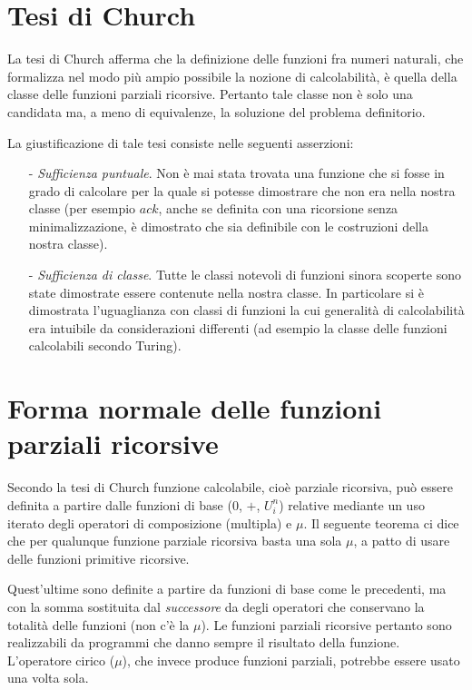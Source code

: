 \documentclass{book}
\begin{document}
\section{Tesi di Church}
La tesi di Church afferma che la definizione delle funzioni fra numeri 
naturali, che formalizza nel modo pi\`u ampio possibile la nozione di 
calcolabilit\`a, \`e quella della classe delle funzioni parziali ricorsive. 
Pertanto tale classe non \`e solo una candidata ma, a meno di equivalenze, la
soluzione del problema definitorio.

La giustificazione di tale tesi consiste nelle seguenti asserzioni:

\begin{enumerate}
\item[-]\emph{Sufficienza puntuale}. Non \`e mai stata trovata una funzione 
  che si fosse in grado di calcolare per la quale si potesse dimostrare che 
  non era nella nostra classe (per esempio $ack$, anche se definita con una
  ricorsione senza minimalizzazione, \`e dimostrato che sia definibile con
  le costruzioni della nostra classe).
\item[-]\emph{Sufficienza di classe}. Tutte le classi notevoli di funzioni
  sinora scoperte sono state dimostrate essere contenute nella nostra classe.
  In particolare si \`e dimostrata l'uguaglianza con classi di funzioni la cui
  generalit\`a di calcolabilit\`a era intuibile da considerazioni differenti 
  (ad esempio la classe delle funzioni calcolabili secondo Turing).
\end{enumerate}

\section{Forma normale delle funzioni parziali ricorsive}
Secondo la tesi di Church funzione calcolabile, cio\`e parziale ricorsiva,
pu\`o essere definita a 
partire dalle funzioni di base ($0$, $+$, $U_i^n$) relative mediante un uso 
iterato degli operatori di composizione (multipla) e $\mu$.
Il seguente teorema ci dice che per qualunque funzione parziale ricorsiva 
basta una sola $\mu$, a patto di usare delle funzioni primitive ricorsive.

Quest'ultime sono definite a partire da funzioni di base come le precedenti, 
ma con la somma sostituita dal \emph{successore} da degli operatori che
conservano la totalit\`a delle funzioni (non c'\`e la $\mu$).
Le funzioni parziali ricorsive pertanto sono realizzabili da programmi che 
danno sempre il risultato della funzione. L'operatore cirico ($\mu$), che 
invece produce funzioni parziali, potrebbe essere usato una volta sola.
\end{document}
